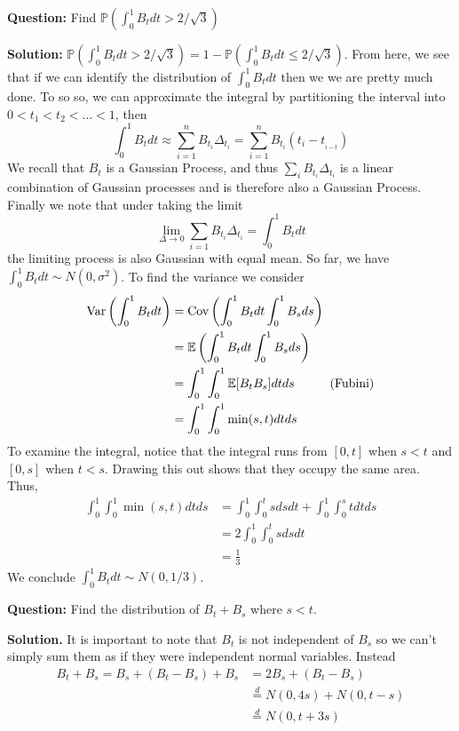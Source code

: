 \documentclass{article}
\begin{document}
\vspace{2mm}

\begin{tcolorbox}[colframe=black,colback=gray!5,boxrule=0.5pt]
\textbf{Question:} Find $\mathbb{P}(\int_0^1B_tdt > 2/\sqrt{3})$ \cite{Fima}
\end{tcolorbox}
\textbf{Solution:} $\mathbb{P}(\int_0^1B_tdt > 2/\sqrt{3}) = 1-\mathbb{P}(\int_0^1B_tdt \leq 2/\sqrt{3})$. From here, we see that if we can identify the distribution of $\int_{0}^{1}B_tdt$ then we we are pretty much done. To so so, we can approximate the integral by partitioning the interval into $0<t_1<t_2<\dots<1$, then
$$\int_{0}^{1}B_t dt \approx \sum_{i=1}^{n}B_{t_i}\Delta_{t_i} = \sum_{i=1}^{n}B_{t_i}(t_{i}-t_{_{i-t}})$$
We recall that $B_t$ is a Gaussian Process, and thus $\sum_iB_{t_i}\Delta_{t_i}$ is a linear combination of Gaussian processes and is therefore also a Gaussian Process. Finally we note that under taking the limit 
$$\lim_{\Delta\to0}\sum_{i=1}B_{t_i}\Delta_{t_i} = \int_{0}^{1}B_t dt$$
the limiting process is also Gaussian with equal mean. So far, we have $\int_{0}^{1}B_tdt\sim N(0, \sigma^2)$. To find the variance we consider
\begin{align*}
    \text{Var}\left(\int_{0}^{1}B_tdt\right) &= \text{Cov}\left(\int_{0}^{1}B_tdt\int_{0}^{1}B_sds\right) \\
    &= \mathbb{E}\left(\int_{0}^{1}B_tdt\int_{0}^{1}B_sds\right) \\
    &=\int_{0}^{1}\int_{0}^{1}\mathbb{E}[B_t B_s]dtds \hspace{10mm} \text{(Fubini)}\\
    &= \int_{0}^{1}\int_{0}^{1}\min(s, t)dtds
\end{align*}
To examine the integral, notice that the integral runs from $[0,t]$ when $s<t$ and $[0,s]$ when $t<s$. Drawing this out shows that they occupy the same area. Thus, 
\begin{align*}
    \int_{0}^{1}\int_{0}^{1}\min(s, t)dtds &= \int_{0}^{1}\int_{0}^{t}sdsdt + \int_{0}^{1}\int_{0}^{s}tdtds \\
    &= 2\int_{0}^{1}\int_{0}^{t}sdsdt \\
    &= \frac{1}{3}
\end{align*}
We conclude $\int_{0}^{1}B_tdt\sim N(0, 1/3)$.

\vspace{2mm}

\begin{tcolorbox}[colframe=black,colback=gray!5,boxrule=0.5pt]
\textbf{Question:} Find the distribution of $B_t + B_s$ where $s < t$.
\end{tcolorbox}
\textbf{Solution.} It is important to note that $B_t$ is not independent of $B_s$ so we can't simply sum them as if they were independent normal variables. Instead 
\begin{align*}
    B_t + B_s = B_s + (B_t - B_s) + B_s &= 2B_s + (B_t-B_s) \\
    &\stackrel{d}{=}N(0, 4s) + N(0, t-s) \\
    &\stackrel{d}{=}N(0, t + 3s)
\end{align*}
\end{document}
